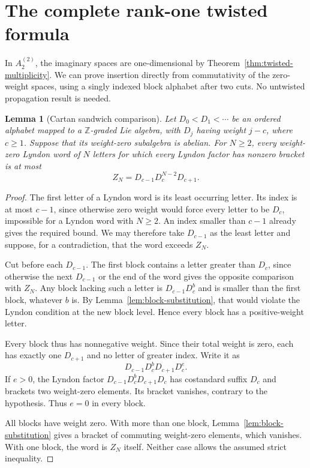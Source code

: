 \documentclass[11pt]{amsart}
\numberwithin{equation}{section}
\newtheorem{lemma}[theorem]{Lemma}
\theoremstyle{definition}
\newcommand{\Z}{\mathbb Z}
\begin{document}
\section{The complete rank-one twisted formula}\label{sec:rankone}

In $A_2^{(2)}$, the imaginary spaces are one-dimensional by Theorem~\ref{thm:twisted-multiplicity}. We can prove insertion directly from commutativity of the zero-weight spaces, using a singly indexed block alphabet after two cuts. No untwisted propagation result is needed.

\begin{lemma}[Cartan sandwich comparison]\label{lem:sandwich}
Let $D_0<D_1<\cdots$ be an ordered alphabet mapped to a $\Z$-graded Lie algebra, with $D_j$ having weight $j-c$, where $c\geq1$. Suppose that its weight-zero subalgebra is abelian. For $N\geq2$, every weight-zero Lyndon word of $N$ letters for which every Lyndon factor has nonzero bracket is at most
\[
 Z_N=D_{c-1}D_c^{N-2}D_{c+1}.
\]
\end{lemma}
\begin{proof}
The first letter of a Lyndon word is its least occurring letter. Its index is at most $c-1$, since otherwise zero weight would force every letter to be $D_c$, impossible for a Lyndon word with $N\geq2$. An index smaller than $c-1$ already gives the required bound. We may therefore take $D_{c-1}$ as the least letter and suppose, for a contradiction, that the word exceeds $Z_N$.

Cut before each $D_{c-1}$. The first block contains a letter greater than $D_c$, since otherwise the next $D_{c-1}$ or the end of the word gives the opposite comparison with $Z_N$. Any block lacking such a letter is $D_{c-1}D_c^b$ and is smaller than the first block, whatever $b$ is. By Lemma~\ref{lem:block-substitution}, that would violate the Lyndon condition at the new block level. Hence every block has a positive-weight letter.

Every block thus has nonnegative weight. Since their total weight is zero, each has exactly one $D_{c+1}$ and no letter of greater index. Write it as
\[
 D_{c-1}D_c^bD_{c+1}D_c^e.
\]
If $e>0$, the Lyndon factor $D_{c-1}D_c^bD_{c+1}D_c$ has costandard suffix $D_c$ and brackets two weight-zero elements. Its bracket vanishes, contrary to the hypothesis. Thus $e=0$ in every block.

All blocks have weight zero. With more than one block, Lemma~\ref{lem:block-substitution} gives a bracket of commuting weight-zero elements, which vanishes. With one block, the word is $Z_N$ itself. Neither case allows the assumed strict inequality.
\end{proof}
\end{document}
